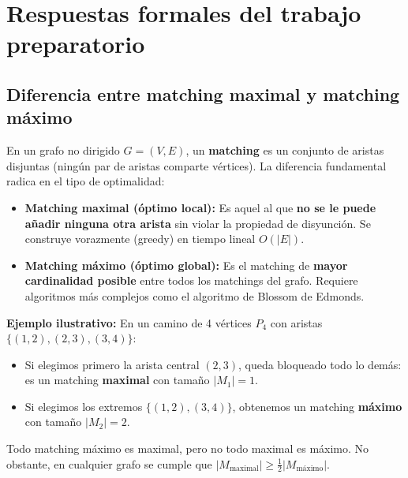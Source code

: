 \section{Respuestas formales del trabajo preparatorio}

\subsection{Diferencia entre matching maximal y matching máximo}
En un grafo no dirigido $G = (V, E)$, un \textbf{matching} es un conjunto de aristas disjuntas (ningún par de aristas comparte vértices). La diferencia fundamental radica en el tipo de optimalidad:
\begin{itemize}
    \item \textbf{Matching maximal (óptimo local):} Es aquel al que \textbf{no se le puede añadir ninguna otra arista} sin violar la propiedad de disyunción. Se construye vorazmente (greedy) en tiempo lineal $O(|E|)$.
    \item \textbf{Matching máximo (óptimo global):} Es el matching de \textbf{mayor cardinalidad posible} entre todos los matchings del grafo. Requiere algoritmos más complejos como el algoritmo de Blossom de Edmonds.
\end{itemize}

\textbf{Ejemplo ilustrativo:} En un camino de 4 vértices $P_4$ con aristas $\{(1,2), (2,3), (3,4)\}$:
\begin{itemize}
    \item Si elegimos primero la arista central $(2,3)$, queda bloqueado todo lo demás: es un matching \textbf{maximal} con tamaño $|M_1| = 1$.
    \item Si elegimos los extremos $\{(1,2), (3,4)\}$, obtenemos un matching \textbf{máximo} con tamaño $|M_2| = 2$.
\end{itemize}
Todo matching máximo es maximal, pero no todo maximal es máximo. No obstante, en cualquier grafo se cumple que $|M_{\text{maximal}}| \ge \frac{1}{2} |M_{\text{máximo}}|$.

